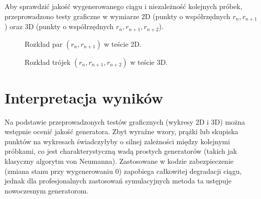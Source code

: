 \documentclass[11pt, a4paper]{article}
\begin{document}
Aby sprawdzić jakość wygenerowanego ciągu i niezależność kolejnych próbek, przeprowadzono testy graficzne w wymiarze 2D (punkty o współrzędnych $r_n, r_{n+1}$) oraz 3D (punkty o współrzędnych $r_n, r_{n+1}, r_{n+2}$).

\begin{figure}[H]
    \centering
    \vspace{5cm} %
    \caption{Rozkład par $(r_n, r_{n+1})$ w teście 2D.}
\end{figure}

\begin{figure}[H]
    \centering
    \vspace{5cm} %
    \caption{Rozkład trójek $(r_n, r_{n+1}, r_{n+2})$ w teście 3D.}
\end{figure}

\section*{Interpretacja wyników}
Na podstawie przeprowadzonych testów graficznych (wykresy 2D i 3D) można wstępnie ocenić jakość generatora. Zbyt wyraźne wzory, prążki lub skupiska punktów na wykresach świadczyłyby o silnej zależności między kolejnymi próbkami, co jest charakterystyczną wadą prostych generatorów (takich jak klasyczny algorytm von Neumanna). Zastosowane w kodzie zabezpieczenie (zmiana stanu przy wygenerowaniu $0$) zapobiega całkowitej degradacji ciągu, jednak dla profesjonalnych zastosowań symulacyjnych metoda ta ustępuje nowoczesnym generatorom.
\end{document}
